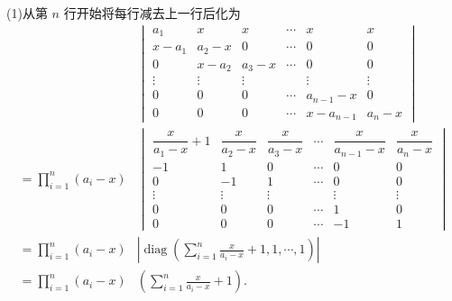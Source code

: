 \begin{sol}
	(1)从第 $n$ 行开始将每行减去上一行后化为
	\begin{align*}
		                      & {}\begin{vmatrix}
			a_1    & x      & x      & \cdots & x         & x      \\
			x-a_1  & a_2-x  & 0      & \cdots & 0         & 0      \\
			0      & x-a_2  & a_3-x  & \cdots & 0         & 0      \\
			\vdots & \vdots & \vdots &        & \vdots    & \vdots \\
			0      & 0      & 0      & \cdots & a_{n-1}-x & 0      \\
			0      & 0      & 0      & \cdots & x-a_{n-1} & a_n-x
		\end{vmatrix}                                                               \\
		=\prod_{i=1}^n(a_i-x)
		                      & {}\begin{vmatrix}
			\dfrac{x}{a_1-x}+1 & \dfrac{x}{a_2-x} & \dfrac{x}{a_3-x} & \cdots & \dfrac{x}{a_{n-1}-x} & \dfrac{x}{a_n-x} \\
			-1                 & 1                & 0                & \cdots & 0                    & 0                \\
			0                  & -1               & 1                & \cdots & 0                    & 0                \\
			\vdots             & \vdots           & \vdots           &        & \vdots               & \vdots           \\
			0                  & 0                & 0                & \cdots & 1                    & 0                \\
			0                  & 0                & 0                & \cdots & -1                   & 1
		\end{vmatrix}                                                               \\
		=\prod_{i=1}^n(a_i-x) & {}\left|\operatorname*{diag}\left(\sum_{i=1}^{n}\frac{x}{a_i-x}+1,1,\cdots,1\right)\right| \\
		=\prod_{i=1}^n(a_i-x) & {}\left(\sum_{i=1}^{n}\frac{x}{a_i-x}+1\right).
	\end{align*}


\end{sol}
